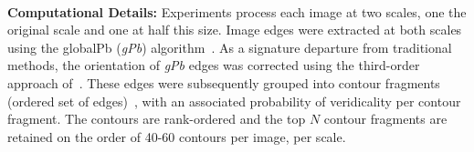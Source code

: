 


\noindent\\
{\bf Computational Details:} Experiments process each image at two scales, one the original scale and one at half this size. Image edges were extracted at both scales using the globalPb ({\it gPb}) algorithm~\cite{Maire:etal:CVPR08}. As a signature departure from traditional methods, the orientation of {\it gPb} edges was corrected using the third-order approach of~\cite{Tamrakar:Kimia:ICCV07}. These edges were subsequently grouped into contour fragments (ordered set of edges)~\cite{Tamrakar:Kimia:ICCV07}, with an associated probability of veridicality per contour fragment. The contours are rank-ordered and the top $N$ contour fragments are retained on the order of 40-60 contours per image, per scale. 

